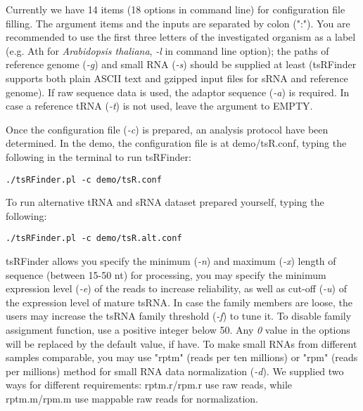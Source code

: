 \documentclass[11pt, a4paper]{article}
\begin{document}
Currently we have 14 items (18 options in command line) for configuration file filling. The argument items and the inputs are separated by colon (":"). You are recommended to use the first three letters of the investigated organism as a label (e.g. Ath for \textit{Arabidopsis thaliana}, \emph{-l} in command line option); the paths of reference genome (\emph{-g}) and small RNA (\emph{-s}) should be supplied at least (tsRFinder supports both plain ASCII text and gzipped input files for sRNA and reference genome). If raw sequence data is used, the adaptor sequence (\emph{-a}) is required. In case a reference tRNA (\emph{-t}) is not used, leave the argument to EMPTY.

Once the configuration file (\emph{-c}) is prepared, an analysis protocol have been determined. In the demo, the configuration file is at demo/tsR.conf, typing the following in the terminal to run tsRFinder:

{\footnotesize \begin{tcolorbox}[colback=blue!5!white,colframe=pink!75!black,title=Running tsRFinder demo]
\begin{verbatim}
./tsRFinder.pl -c demo/tsR.conf
\end{verbatim}
\end{tcolorbox}}

To run alternative tRNA and sRNA dataset prepared yourself, typing the following:

{\footnotesize \begin{tcolorbox}[colback=blue!5!white,colframe=pink!75!black,title=Running tsRFinder alternative demo]
\begin{verbatim}
./tsRFinder.pl -c demo/tsR.alt.conf
\end{verbatim}
\end{tcolorbox}}

tsRFinder allows you specify the minimum (\emph{-n}) and maximum (\emph{-x}) length of sequence (between 15-50 nt) for processing, you may specify the minimum expression level (\emph{-e}) of the reads to increase reliability, as well as cut-off (\emph{-u}) of the expression level of mature tsRNA. In case the family members are loose, the users may increase the tsRNA family threshold (\emph{-f}) to tune it. To disable family assignment function, use a positive integer below 50. Any \emph{0} value in the options will be replaced by the default value, if have. To make small RNAs from different samples comparable, you may use "rptm" (reads per ten millions) or "rpm" (reads per millions) method for small RNA data normalization (\emph{-d}). We supplied two ways for different requirements: rptm.r/rpm.r use raw reads, while rptm.m/rpm.m use mappable raw reads for normalization.
\end{document}
